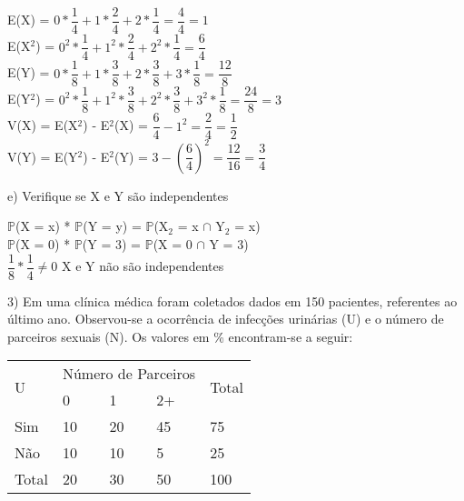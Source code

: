 \documentclass[12pt,a4paper,draft]{article}
\begin{document}
	\begin{center}
		E(X) = $0 * \dfrac{1}{4} + 1 * \dfrac{2}{4} + 2 * \dfrac{1}{4} = \dfrac{4}{4} = 1$
		\vspace{1cm}\\
		E(X$^2$) = $0^2 * \dfrac{1}{4} + 1^2 * \dfrac{2}{4} + 2^2 * \dfrac{1}{4} = \dfrac{6}{4}$
		\vspace{1cm}\\
		E(Y) = $0 * \dfrac{1}{8} + 1 * \dfrac{3}{8} + 2 * \dfrac{3}{8} + 3 * \dfrac{1}{8} = \dfrac{12}{8}$
		\vspace{1cm}\\
		E(Y$^2$) = $0^2 * \dfrac{1}{8} + 1^2 * \dfrac{3}{8} + 2^2 * \dfrac{3}{8} + 3^2 * \dfrac{1}{8} = \dfrac{24}{8} = 3$
		\vspace{1cm}\\
		V(X) = E(X$^2$) - E$^2$(X) = $\dfrac{6}{4} - 1^2 = \dfrac{2}{4} = \dfrac{1}{2}$
		\vspace{1cm}\\
		V(Y) = E(Y$^2$) - E$^2$(Y) = $3 - \left(\dfrac{6}{4}\right)^2 = \dfrac{12}{16} = \dfrac{3}{4}$
	\end{center}
	\vspace{1cm}
	e) Verifique se X e Y são independentes
	\vspace{1cm}\\
	\begin{center}
		$\mathbb{P}$(X = x) * $\mathbb{P}$(Y = y) = $\mathbb{P}$(X$_{2}$ = x $\cap$ Y$_{2}$ = x)
		\vspace{1cm}\\
		$\mathbb{P}$(X = 0) * $\mathbb{P}$(Y = 3) = $\mathbb{P}$(X = 0 $\cap$ Y = 3)
		\vspace{0.25cm}\\
		$\dfrac{1}{8} * \dfrac{1}{4} \neq 0$
		X e Y não são independentes
	\end{center}
	\vspace{1cm}
	3) Em uma clínica médica foram coletados dados em 150 pacientes, referentes ao último ano. Observou-se a ocorrência de infecções urinárias (U) e o número de parceiros sexuais (N). Os valores em \% encontram-se a seguir:\\
	\begin{center}
		\begin{tabular}{|l|l|l|l|l|}\hline
		\multirow{2}{*}{U} & \multicolumn{3}{l|}{Número de Parceiros} & \multirow{2}{*}{Total}\\ \cline{2-4}
		& 0 & 1 & 2+ & \\ \hline
		Sim & 10 & 20 & 45 & 75\\ \hline
		Não & 10 & 10 & 5 & 25\\ \hline
		Total & 20 & 30 & 50 & 100\\ \hline
		\end{tabular}
	\end{center}
\end{document}
